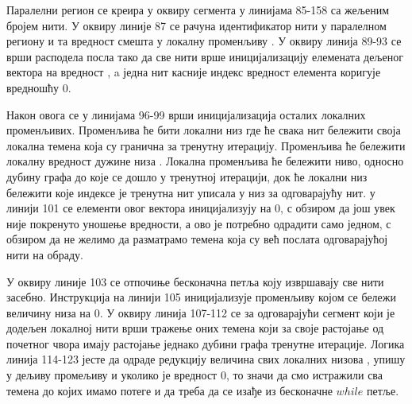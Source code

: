 \par
Паралелни регион се креира у оквиру сегмента у линијама 85-158 са жељеним бројем нити. У оквиру линије 87 се рачуна идентификатор нити у паралелном региону и та вредност смешта у локалну променљиву . У оквиру линија 89-93 се врши расподела посла тако да све нити врше иницијализацију елемената дељеног вектора  на вредност , a једна нит касније индекс вредност елемента  коригује вредношћу $0$.

\par
Након овога се у линијама 96-99 врши иницијализација осталих локалних променљивих. Променљива  ће бити локални низ где ће свака нит бележити своја локална темена која су гранична за тренутну итерацију. Променљива  ће бележити локалну вредност дужине низа . Локална променљива  ће бележити ниво, односно дубину графа до које се дошло у тренутној итерацији, док ће локални низ  бележити које индексе је тренутна нит уписала у низ  за одговарајућу нит. у линији 101 се елементи овог вектора иницијализују на $0$, с обзиром да још увек није покренуто уношење вредности, а ово је потребно одрадити само једном, с обзиром да не желимо да разматрамо темена која су већ послата одговарајућој нити на обраду.

\par
У оквиру линије 103 се отпочиње бесконачна  петља коју извршавају све нити засебно. Инструкција на линији 105 иницијализује променљиву којом се бележи величину низа  на $0$. У оквиру линија 107-112 се за одговарајући сегмент који је додељен локалној нити врши тражење оних темена који за своје растојање од почетног чвора имају растојање једнако дубини графа тренутне итерације. Логика линија 114-123 јесте да одраде редукцију величина свих локалних низова , упишу у дељиву промељиву и уколико је вредност $0$, то значи да смо истражили сва темена до којих имамо потеге и да треба да се изађе из бесконачне $while$ петље.


